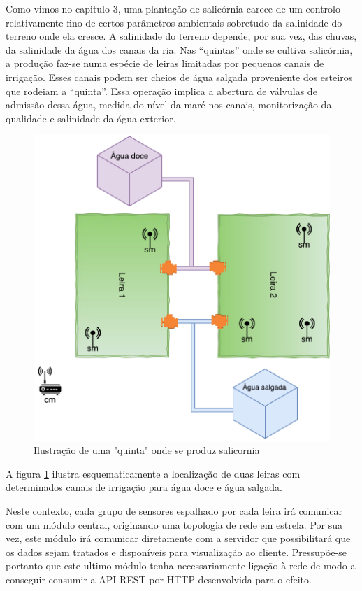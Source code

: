 Como vimos no capitulo 3, uma plantação de  salicórnia carece de um controlo relativamente fino de certos parâmetros ambientais sobretudo da salinidade do terreno onde ela cresce. A salinidade do terreno depende, por sua vez, das chuvas, da salinidade da água dos canais da ria. Nas “quintas” onde se cultiva salicórnia, a produção faz-se numa espécie de leiras limitadas por pequenos canais de irrigação. Esses canais podem ser cheios de água salgada proveniente dos esteiros que rodeiam a “quinta”. Essa operação implica a abertura de válvulas de admissão dessa água, medida do nível da maré nos canais, monitorização da qualidade e salinidade da água exterior.


\begin{figure}[!htb]
	\centering
	\includegraphics[scale=0.55]{esquemas/leiras-comm-geral.pdf}
	\caption{Ilustração de uma "quinta" onde se produz salicornia}
	\label{leira}
\end{figure}

A figura \ref{leira} ilustra esquematicamente a localização de duas leiras com determinados canais de irrigação para água doce e água salgada. 
 


Neste contexto, cada grupo de sensores espalhado por cada leira irá comunicar com um módulo central, originando uma topologia de rede em estrela.  Por sua vez, este módulo irá comunicar diretamente com a servidor que possibilitará que os dados sejam tratados e disponíveis para visualização ao cliente. Pressupõe-se portanto que este ultimo módulo tenha necessariamente ligação à rede de modo a conseguir consumir a API REST por HTTP desenvolvida para o efeito. 


